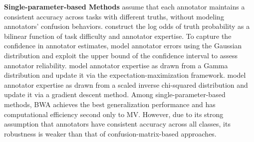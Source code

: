 \documentclass[letterpaper]{article} %
\begin{document}
\textbf{Single-parameter-based Methods} assume that each annotator maintains a consistent accuracy across tasks with different truths, without modeling annotators' confusion behaviors. \citet{Whitehilletal2009} construct the log odds of truth probability as a bilinear function of task difficulty and annotator expertise. To capture the confidence in annotator estimates, \citet{Lietal2014} model annotator errors using the Gaussian distribution and exploit the upper bound of the confidence interval to assess annotator reliability. \citet{Lietal2019b} model annotator expertise as drawn from a Gamma distribution and update it via the expectation-maximization framework. \citet{Caoetal2020} model annotator expertise as drawn from a scaled inverse chi-squared distribution and update it via a gradient descent method. Among single-parameter-based methods, BWA \cite{Lietal2019b} achieves the best generalization performance and has computational efficiency second only to MV. However, due to its strong assumption that annotators have consistent accuracy across all classes, its robustness is weaker than that of confusion-matrix-based approaches.
\end{document}
